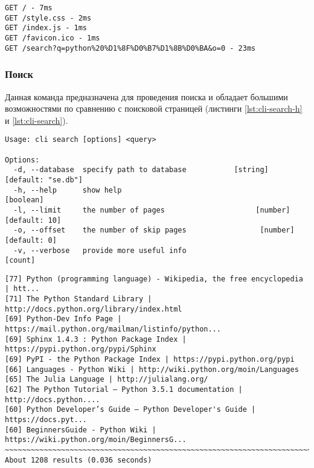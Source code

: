 \begin{lstlisting}[caption=Интерфейс командной строки: сервер., label=lst:cli-server]
GET / - 7ms
GET /style.css - 2ms
GET /index.js - 1ms
GET /favicon.ico - 1ms
GET /search?q=python%20%D1%8F%D0%B7%D1%8B%D0%BA&o=0 - 23ms
\end{lstlisting}


\subsubsection*{Поиск}
Данная команда предназначена для проведения поиска и обладает большими возможностями по сравнению с поисковой страницей (листинги \ref{lst:cli-search-h} и \ref{lst:cli-search}).
\begin{lstlisting}[caption=Интерфейс командной строки: поиск., label=lst:cli-search-h]
Usage: cli search [options] <query>

Options:
  -d, --database  specify path to database           [string] [default: "se.db"]
  -h, --help      show help                                            [boolean]
  -l, --limit     the number of pages                     [number] [default: 10]
  -o, --offset    the number of skip pages                 [number] [default: 0]
  -v, --verbose   provide more useful info                               [count]
\end{lstlisting}

\begin{lstlisting}[caption=Интерфейс командной строки: поиск., label=lst:cli-search]
[77] Python (programming language) - Wikipedia, the free encyclopedia | htt...
[71] The Python Standard Library | http://docs.python.org/library/index.html
[69] Python-Dev Info Page | https://mail.python.org/mailman/listinfo/python...
[69] Sphinx 1.4.3 : Python Package Index | https://pypi.python.org/pypi/Sphinx
[69] PyPI - the Python Package Index | https://pypi.python.org/pypi
[66] Languages - Python Wiki | http://wiki.python.org/moin/Languages
[65] The Julia Language | http://julialang.org/
[62] The Python Tutorial — Python 3.5.1 documentation | http://docs.python....
[60] Python Developer’s Guide — Python Developer's Guide | https://docs.pyt...
[60] BeginnersGuide - Python Wiki | https://wiki.python.org/moin/BeginnersG...
~~~~~~~~~~~~~~~~~~~~~~~~~~~~~~~~~~~~~~~~~~~~~~~~~~~~~~~~~~~~~~~~~~~~~~~~~~~~~~
About 1208 results (0.036 seconds)
\end{lstlisting}

